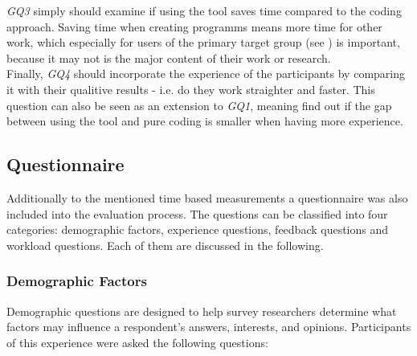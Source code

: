 \textit{GQ3} simply should examine if using the tool saves time compared to the coding approach. Saving time when creating programms means more time for other work, which especially for users of the primary target group (see ) is important, because it may not is the major content of their work or research. \\

Finally, \textit{GQ4} should incorporate the experience of the participants by comparing it with their qualitive results - i.e. do they work straighter and faster. This question can also be seen as an extension to \textit{GQ1}, meaning find out if the gap between using the tool and pure coding is smaller when having more experience.

\subsection{Questionnaire} \label{sec:Questionnaire}
Additionally to the mentioned time based measurements a questionnaire was also included into the evaluation process. The questions can be classified into four categories: demographic factors, experience questions, feedback questions and workload questions. Each of them are discussed in the following.

\subsubsection*{Demographic Factors}
Demographic questions are designed to help survey researchers determine what factors may influence a respondent's answers, interests, and opinions. Participants of this experience were asked the following questions:

